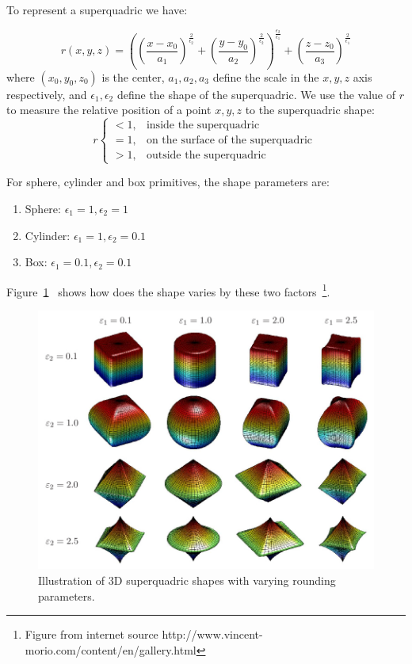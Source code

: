 To represent a superquadric we have:

\begin{equation}
r\left(x, y ,z\right) =
\left(\left(\frac{x-x_0}{a_1}\right)^{\frac{2}{\epsilon_2}} +
    \left(\frac{y-y_0}{a_2}\right)^{\frac{2}{\epsilon_2}}\right)^
    {\frac{\epsilon_2}{\epsilon_1}} +
    \left(\frac{z-z_0}{a_3}\right)^\frac{2}{\epsilon_1}
\end{equation}
where $\left(x_0, y_0, z_0\right)$ is the center, $a_1, a_2, a_3$ define the scale in the $x, y, z$ axis respectively, and $\epsilon_1, \epsilon_2$ define the shape of the superquadric.
We use the value of $r$ to measure the relative position of a point $x, y, z$ to the superquadric shape:
\begin{equation}
    r
    \begin{cases}
      <1, & \text{inside the superquadric}\  \\
      =1, & \text{on the surface of the superquadric}\ \\
      >1, & \text{outside the superquadric}
    \end{cases}
\end{equation}

For sphere, cylinder and box primitives, the shape parameters are:

\begin{enumerate}
\item Sphere: $\epsilon_1 = 1, \epsilon_2 = 1$
\item Cylinder: $\epsilon_1 = 1, \epsilon_2 = 0.1$
\item Box: $\epsilon_1 = 0.1, \epsilon_2 = 0.1$
\end{enumerate}

Figure~\ref{fig:sq}~ shows how does the shape varies by these two factors~\footnote{Figure from internet source http://www.vincent-morio.com/content/en/gallery.html}.

\begin{figure}
  \centering
  \includegraphics[width=14cm]{./fig_cha3/superquadrics.jpg}
  \caption{Illustration of 3D superquadric shapes with varying rounding parameters\protect\footnotemark.}
  \label{fig:sq}
\end{figure}


